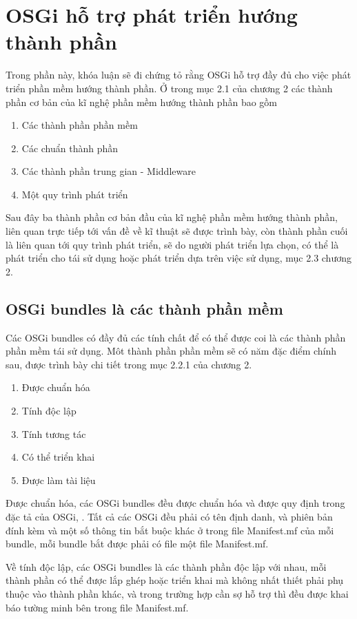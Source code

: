 \section{OSGi hỗ trợ phát triển hướng thành phần}
Trong phần này, khóa luận sẽ đi chứng tỏ rằng OSGi hỗ trợ đầy đủ cho việc phát triển phần mềm hướng thành phần.
Ở trong mục 2.1 của chương 2 các thành phần cơ bản của kĩ nghệ phần mềm hướng thành phần bao gồm
\begin{enumerate}
	\item Các thành phần phần mềm
	\item Các chuẩn thành phần
	\item Các thành phần trung gian - Middleware
	\item Một quy trình phát triển
\end{enumerate}
Sau đây ba thành phần cơ bản đầu của kĩ nghệ phần mềm hướng thành phần, liên quan trực tiếp tới vấn đề về kĩ thuật sẽ được trình bày, còn thành phần cuối là liên quan tới quy trình phát triển, sẽ do người phát triển lựa chọn, có thể là phát triển cho tái sử dụng hoặc phát triển dựa trên việc sử dụng, mục 2.3 chương 2.
\subsection{OSGi bundles là các thành phần mềm}
Các OSGi bundles có đầy đủ các tính chất để có thể được coi là các thành phần phần mềm tái sử dụng.
Môt thành phần phần mềm sẽ có năm đặc điểm chính sau, được trình bày chi tiết trong mục 2.2.1 của chương 2.
\begin{enumerate}
	\item Được chuẩn hóa 
	\item Tính độc lập
	\item Tính tương tác
	\item Có thể triển khai
	\item Được làm tài liệu\\
\end{enumerate}

Được chuẩn hóa, các OSGi bundles đều được chuẩn hóa và được quy định trong đặc tả của OSGi, \cite{osgicore5}. Tất cả các OSGi đều phải có tên định danh, và phiên bản đính kèm và một số thông tin bắt buộc khác ở trong file Manifest.mf của mỗi bundle, mỗi bundle bắt được phải có file một file Manifest.mf.

Về tính độc lập, các OSGi bundles là các thành phần độc lập với nhau,  mỗi thành phần có thể được lắp ghép hoặc triển khai mà không nhất thiết phải phụ thuộc vào thành phần khác, và trong trường hợp cần sợ hỗ trợ thì đều được khai báo tường minh bên trong file Manifest.mf.

